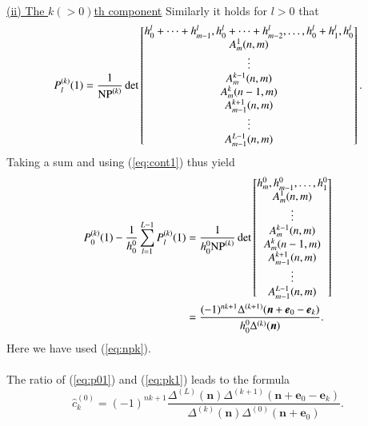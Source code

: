 \documentclass[12pt]{article}
\numberwithin{equation}{section}
\begin{document}
\paragraph{}
\noindent
\underline{(ii) The $k(> 0)$th component}
\quad
Similarly it holds for $l>0$
that
\[
P_l^{(k)}(1) 
=\frac{1}{{\rm NP}^{(k)}}
\det 
\begin{bmatrix}
h_0^l +\cdots+h_{m-1}^l, 
h_0^l +\cdots+h_{m-2}^l, 
 \ldots,  
h_0^l +h_{1}^l, 
h_0^l
\\
A^1_{m}(n,m) 
\\
\vdots
\\
A^{k-1}_{m}(n,m)
\\ 
A^{k}_{m}(n-1,m)
\\ 
A^{k+1}_{m-1}(n,m)
\\
\vdots \\
A^{L-1}_{m-1}(n,m) 
\end{bmatrix}.
\]
Taking a sum and using  (\ref{eq:cont1})
thus yield
\begin{align}
P^{(k)}_0(1)-\frac{1}{h^0_0} \sum_{l=1}^{L-1} P^{(k)}_l(1)
&=\frac{1}{ h^0_0 {\rm NP}^{(k)}}
\det 
\begin{bmatrix}
h^0_m,h^0_{m-1}, \ldots, h^0_1
\\
A^1_{m}(n,m) 
\\
\vdots
\\
A^{k-1}_{m}(n,m)
\\ 
A^{k}_{m}(n-1,m)
\\ 
A^{k+1}_{m-1}(n,m)
\\
\vdots \\
A^{L-1}_{m-1}(n,m) 
\end{bmatrix}
\nonumber
\\
&=\frac{(-1)^{nk+1}\Delta^{(k+1)}({\boldsymbol n}+{\boldsymbol e}_0-{\boldsymbol e}_k) }{ h^0_0\Delta^{(k)}  ({\boldsymbol n}) }.
\label{eq:pk1}
\end{align}
Here we have used (\ref{eq:npk}).



\paragraph{}
The ratio of
 (\ref{eq:p01}) and (\ref{eq:pk1})
 leads to the formula
\[
\hat{c}^{(0)}_k=
(-1)^{nk+1}
\frac{ \Delta^{(L)} ({\boldsymbol n})  
\Delta^{(k+1)} ({\boldsymbol n}+{\boldsymbol e}_0-{\boldsymbol e}_k) 
}{ \Delta^{(k)}  ({\boldsymbol n}) 
\Delta^{(0)}({\boldsymbol n}+{\boldsymbol e}_0) 
} .
\]
\end{document}
